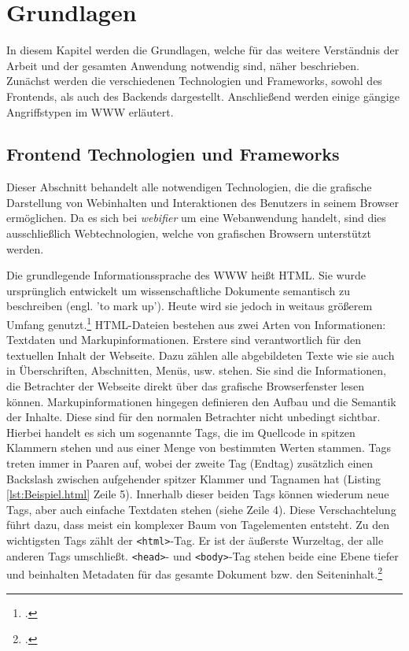 \chapter{Grundlagen}

In diesem Kapitel werden die Grundlagen, welche für das weitere Verständnis der Arbeit und der
gesamten Anwendung notwendig sind, näher beschrieben. Zunächst werden die verschiedenen Technologien und Frameworks, sowohl des Frontends, als auch des Backends dargestellt. Anschließend werden einige gängige Angriffstypen im \ac{WWW} erläutert.

\section{Frontend Technologien und Frameworks}

Dieser Abschnitt behandelt alle notwendigen Technologien, die die grafische Darstellung von
Webinhalten und Interaktionen des Benutzers in seinem Browser ermöglichen. Da es sich bei \textit{webifier} um
eine Webanwendung handelt, sind dies ausschließlich Webtechnologien, welche von grafischen Browsern
unterstützt werden.

Die grundlegende Informationssprache des \ac{WWW} heißt \ac{HTML}. Sie wurde ursprünglich entwickelt
um wissenschaftliche Dokumente semantisch zu beschreiben (engl. 'to mark up'). Heute wird sie
jedoch in weitaus größerem Umfang genutzt.\footcite[Vgl.][]{html5Spec} \ac{HTML}-Dateien bestehen
aus zwei Arten von Informationen: Textdaten und Markupinformationen.
Erstere sind verantwortlich für den textuellen Inhalt der Webseite. Dazu zählen alle abgebildeten
Texte wie sie auch in Überschriften, Abschnitten, Menüs, usw. stehen. Sie sind die Informationen,
die Betrachter der Webseite direkt über das grafische Browserfenster lesen können.
Markupinformationen hingegen definieren den Aufbau und die Semantik der Inhalte. Diese sind für den
normalen Betrachter nicht unbedingt sichtbar. Hierbei handelt es sich um sogenannte Tags,
die im Quellcode in spitzen Klammern stehen und aus einer Menge von bestimmten Werten stammen. Tags
treten immer in Paaren auf, wobei der zweite Tag (Endtag) zusätzlich einen Backslash zwischen
aufgehender spitzer Klammer und Tagnamen hat (Listing \ref{lst:Beispiel.html} Zeile 5).
Innerhalb dieser beiden Tags können wiederum neue Tags, aber auch einfache Textdaten stehen (siehe
Zeile 4).
Diese Verschachtelung führt dazu, dass meist ein komplexer Baum von Tagelementen entsteht. Zu den
wichtigsten Tags zählt der \lstinline[style=eclipse]{<html>}-Tag. Er ist der äußerste Wurzeltag,
der alle anderen Tags umschließt. \lstinline[style=eclipse]{<head>}- und
\lstinline[style=eclipse]{<body>}-Tag stehen beide eine Ebene tiefer und beinhalten Metadaten für
das gesamte Dokument bzw. den Seiteninhalt.\footcite[Vgl.][57]{webTechnologies}


